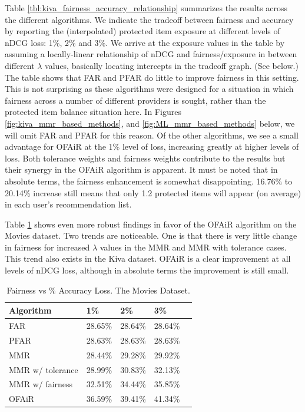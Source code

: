 Table \ref{tbl:kiva_fairness_accuracy_relationship} summarizes the results across the different algorithms. We indicate the tradeoff between fairness and accuracy by reporting the (interpolated) protected item exposure at different levels of nDCG loss: 1\%, 2\% and 3\%. We arrive at the exposure values in the table by assuming a locally-linear relationship of nDCG and fairness/exposure in between different $\lambda$ values, basically locating intercepts in the tradeoff graph. (See below.) The table shows that FAR and PFAR do little to improve fairness in this setting. This is not surprising as these algorithms were designed for a situation in which fairness across a number of different providers is sought, rather than the protected item balance situation here. In Figures \ref{fig:kiva_mmr_based_methods}, and \ref{fig:ML_mmr_based_methods} below, we will omit FAR and PFAR for this reason. Of the other algorithms, we see a small advantage for OFAiR at the 1\% level of loss, increasing greatly at higher levels of loss. Both tolerance weights and fairness weights contribute to the results but their synergy in the OFAiR algorithm is apparent. It must be noted that in absolute terms, the fairness enhancement is somewhat disappointing. 16.76\% to 20.14\% increase still means that only 1.2 protected items will appear (on average) in each user's recommendation list. 

Table \ref{tbl:ML_fairness_accuracy_relationship} shows even more robust findings in favor of the OFAiR algorithm on the Movies dataset. Two trends are noticeable. One is that there is very little change in fairness for increased $\lambda$ values in the MMR and MMR with tolerance cases. This trend also exists in the Kiva dataset. OFAiR is a clear improvement at all levels of nDCG loss, although in absolute terms the improvement is still small.

\vspace{0.25cm}
\begin{table}[]
\centering
\begin{tabular}{lllll}
 
 Algorithm &  1\% & 2\% & 3\% \\
 \hline
 FAR & 28.65\% & 28.64\% & 28.64\% \\
 PFAR & 28.63\% & 28.63\% & 28.63\% \\
 MMR &  28.44\% & 29.28\% & 29.92\% \\
 MMR w/ tolerance & 28.99\% & 30.83\% & 32.13\%  \\
 MMR w/ fairness & 32.51\% & 34.44\% & 35.85\%  \\
 OFAiR & 36.59\% & 39.41\% & 41.34\% \\
 
 \hline
\end{tabular}
\caption{Fairness vs \% Accuracy Loss. The Movies Dataset.}
\label{tbl:ML_fairness_accuracy_relationship}
\end{table}

